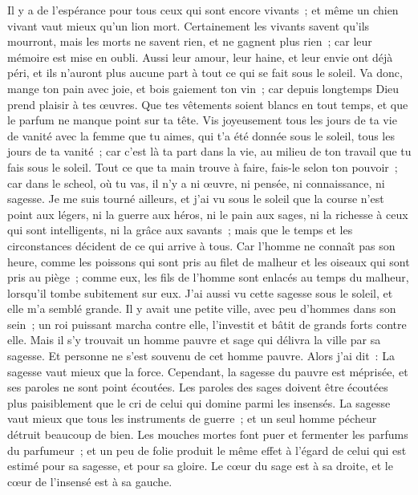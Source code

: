 \begin{multicols}{2}
Il y a de l'espérance pour tous ceux qui sont encore vivants~; et même un chien vivant vaut mieux qu'un lion mort.
Certainement les vivants savent qu'ils mourront, mais les morts ne savent rien, et ne gagnent plus rien~; car leur mémoire est mise en oubli. 
Aussi leur amour, leur haine, et leur envie ont déjà péri, et ils n'auront plus aucune part à tout ce qui se fait sous le soleil.
Va donc, mange ton pain avec joie, et bois gaiement ton vin~; car depuis longtemps Dieu prend plaisir à tes œuvres.
Que tes vêtements soient blancs en tout temps, et que le parfum ne manque point sur ta tête. 
Vis joyeusement tous les jours de ta vie de vanité avec la femme que tu aimes, qui t'a été donnée sous le soleil, tous les jours de ta vanité~; car c'est là ta part dans la vie, au milieu de ton travail que tu fais sous le soleil.
Tout ce que ta main trouve à faire, fais-le selon ton pouvoir~; car dans le scheol, où tu vas, il n'y a ni œuvre, ni pensée, ni connaissance, ni sagesse.
Je me suis tourné ailleurs, et j'ai vu sous le soleil que la course n'est point aux légers, ni la guerre aux héros, ni le pain aux sages, ni la richesse à ceux qui sont intelligents, ni la grâce aux savants~; mais que le temps et les circonstances décident de ce qui arrive à tous.
Car l'homme ne connaît pas son heure, comme les poissons qui sont pris au filet de malheur et les oiseaux qui sont pris au piège~; comme eux, les fils de l'homme sont enlacés au temps du malheur, lorsqu'il tombe subitement sur eux.
J'ai aussi vu cette sagesse sous le soleil, et elle m'a semblé grande.
Il y avait une petite ville, avec peu d'hommes dans son sein~; un roi puissant marcha contre elle, l'investit et bâtit de grands forts contre elle.
Mais il s'y trouvait un homme pauvre et sage qui délivra la ville par sa sagesse. Et personne ne s'est souvenu de cet homme pauvre.
Alors j'ai dit~: La sagesse vaut mieux que la force. Cependant, la sagesse du pauvre est méprisée, et ses paroles ne sont point écoutées.
Les paroles des sages doivent être écoutées plus paisiblement que le cri de celui qui domine parmi les insensés. 
La sagesse vaut mieux que tous les instruments de guerre~; et un seul homme pécheur détruit beaucoup de bien.
\VerseOne{} Les mouches mortes font puer et fermenter les parfums du parfumeur~; et un peu de folie produit le même effet à l'égard de celui qui est estimé pour sa sagesse, et pour sa gloire.
Le cœur du sage est à sa droite, et le cœur de l'insensé est à sa gauche.

\end{multicols}
